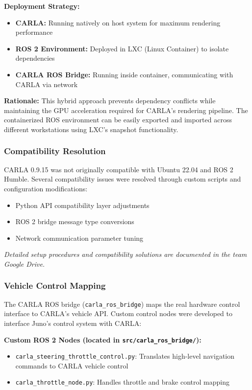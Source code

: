 \textbf{Deployment Strategy:}
\begin{itemize}
    \item \textbf{CARLA:} Running natively on host system for maximum rendering performance
    \item \textbf{ROS 2 Environment:} Deployed in LXC (Linux Container) to isolate dependencies
    \item \textbf{CARLA ROS Bridge:} Running inside container, communicating with CARLA via network
\end{itemize}

\textbf{Rationale:} This hybrid approach prevents dependency conflicts while maintaining the GPU acceleration required for CARLA's rendering pipeline. The containerized ROS environment can be easily exported and imported across different workstations using LXC's snapshot functionality.

\subsubsection{Compatibility Resolution}
CARLA 0.9.15 was not originally compatible with Ubuntu 22.04 and ROS 2 Humble. Several compatibility issues were resolved through custom scripts and configuration modifications:
\begin{itemize}
    \item Python API compatibility layer adjustments
    \item ROS 2 bridge message type conversions
    \item Network communication parameter tuning
\end{itemize}

\textit{Detailed setup procedures and compatibility solutions are documented in the team Google Drive.}

\subsubsection{Vehicle Control Mapping}
The CARLA ROS bridge (\texttt{carla\_ros\_bridge}) maps the real hardware control interface to CARLA's vehicle API. Custom control nodes were developed to interface Juno's control system with CARLA:

\textbf{Custom ROS 2 Nodes (located in \texttt{src/carla\_ros\_bridge/}):}
\begin{itemize}
    \item \texttt{carla\_steering\_throttle\_control.py}: Translates high-level navigation commands to CARLA vehicle control
    \item \texttt{carla\_throttle\_node.py}: Handles throttle and brake control mapping
\end{itemize}

